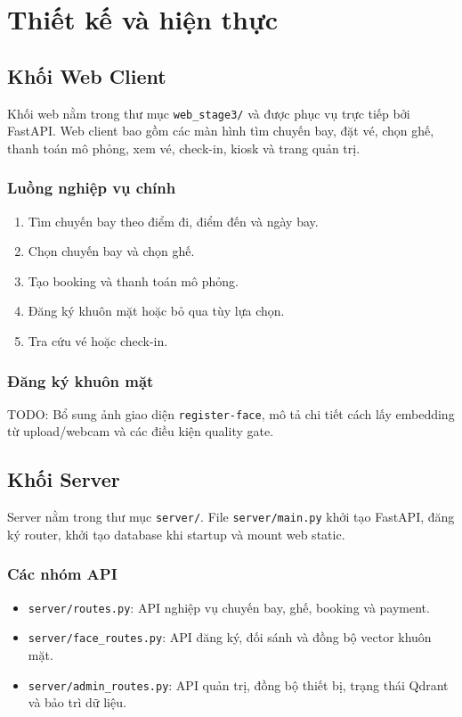 \section{Thiết kế và hiện thực}

\subsection{Khối Web Client}
Khối web nằm trong thư mục \texttt{web\_stage3/} và được phục vụ trực tiếp bởi FastAPI. Web client bao gồm các màn hình tìm chuyến bay, đặt vé, chọn ghế, thanh toán mô phỏng, xem vé, check-in, kiosk và trang quản trị.

\subsubsection{Luồng nghiệp vụ chính}
\begin{enumerate}
  \item Tìm chuyến bay theo điểm đi, điểm đến và ngày bay.
  \item Chọn chuyến bay và chọn ghế.
  \item Tạo booking và thanh toán mô phỏng.
  \item Đăng ký khuôn mặt hoặc bỏ qua tùy lựa chọn.
  \item Tra cứu vé hoặc check-in.
\end{enumerate}

\subsubsection{Đăng ký khuôn mặt}
TODO: Bổ sung ảnh giao diện \texttt{register-face}, mô tả chi tiết cách lấy embedding từ upload/webcam và các điều kiện quality gate.

\subsection{Khối Server}
Server nằm trong thư mục \texttt{server/}. File \texttt{server/main.py} khởi tạo FastAPI, đăng ký router, khởi tạo database khi startup và mount web static.

\subsubsection{Các nhóm API}
\begin{itemize}
  \item \texttt{server/routes.py}: API nghiệp vụ chuyến bay, ghế, booking và payment.
  \item \texttt{server/face\_routes.py}: API đăng ký, đối sánh và đồng bộ vector khuôn mặt.
  \item \texttt{server/admin\_routes.py}: API quản trị, đồng bộ thiết bị, trạng thái Qdrant và bảo trì dữ liệu.
\end{itemize}

